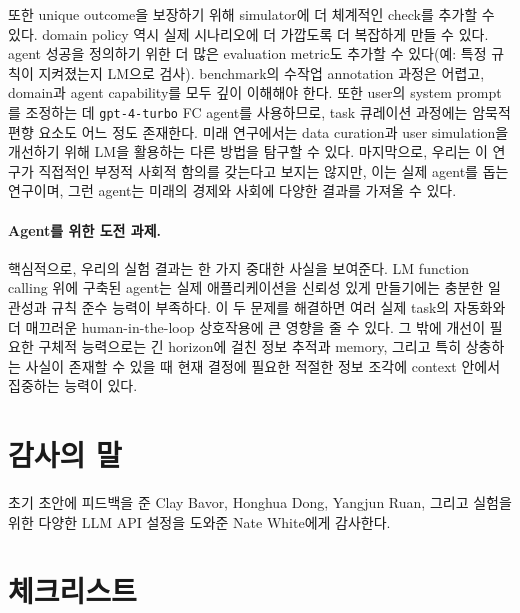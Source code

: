 \documentclass{article}
\begin{document}
또한 unique outcome을 보장하기 위해 simulator에 더 체계적인 check를 추가할 수 있다. domain policy 역시 실제 시나리오에 더 가깝도록 더 복잡하게 만들 수 있다. agent 성공을 정의하기 위한 더 많은 evaluation metric도 추가할 수 있다(예: 특정 규칙이 지켜졌는지 LM으로 검사). benchmark의 수작업 annotation 과정은 어렵고, domain과 agent capability를 모두 깊이 이해해야 한다. 또한 user의 system prompt를 조정하는 데 \texttt{gpt-4-turbo} FC agent를 사용하므로, task 큐레이션 과정에는 암묵적 편향 요소도 어느 정도 존재한다. 미래 연구에서는 data curation과 user simulation을 개선하기 위해 LM을 활용하는 다른 방법을 탐구할 수 있다. 마지막으로, 우리는 이 연구가 직접적인 부정적 사회적 함의를 갖는다고 보지는 않지만, 이는 실제 agent를 돕는 연구이며, 그런 agent는 미래의 경제와 사회에 다양한 결과를 가져올 수 있다.

\paragraph{Agent를 위한 도전 과제.}
핵심적으로, 우리의 실험 결과는 한 가지 중대한 사실을 보여준다. LM function calling 위에 구축된 agent는 실제 애플리케이션을 신뢰성 있게 만들기에는 충분한 일관성과 규칙 준수 능력이 부족하다. 이 두 문제를 해결하면 여러 실제 task의 자동화와 더 매끄러운 human-in-the-loop 상호작용에 큰 영향을 줄 수 있다. 그 밖에 개선이 필요한 구체적 능력으로는 긴 horizon에 걸친 정보 추적과 memory, 그리고 특히 상충하는 사실이 존재할 수 있을 때 현재 결정에 필요한 적절한 정보 조각에 context 안에서 집중하는 능력이 있다.

\section*{감사의 말}
초기 초안에 피드백을 준 Clay Bavor, Honghua Dong, Yangjun Ruan, 그리고 실험을 위한 다양한 LLM API 설정을 도와준 Nate White에게 감사한다.




\newpage

\section*{체크리스트}
\end{document}

